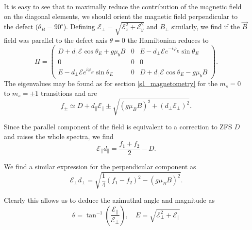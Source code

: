 It is easy to see that to maximally reduce the contribution of the magnetic field on the diagonal elements, we should orient the magnetic field perpendicular to the defect ($\theta_B = 90^\circ$). Defining $\mathcal{E}_\perp = \sqrt{\mathcal{E}_x^2 + \mathcal{E}_y^2}$ and $B_\perp$ similarly, we find if the $\vec{B}$ field was parallel to the defect axis $\theta = 0$ the Hamiltonian reduces to \begin{equation}
H = \begin{pmatrix}
	D + d_\parallel \mathcal{E}\cos\theta_E + g\mu_b B & 0                                                                        & E - d_\perp \mathcal{E} e^{-i \varphi_E}\sin\theta_E                  \\
	0                                                  & 0                                                                        & 0    \\
	E - d_\perp\mathcal{E}e^{i \varphi_E}\sin\theta_E  & 0 & D+ d_\parallel \mathcal{E}\cos\theta_E - g\mu_b B 
\end{pmatrix}.
\label{eq:}
\end{equation}
The eigenvalues may be found as for section \ref{s1_magnetometry} for the $m_s = 0$ to $m_s = \pm 1$ transitions and are  
\begin{equation}
    f_{\pm} \simeq D + d_\parallel \mathcal{E}_\parallel\pm \sqrt{(g \mu_B B)^2 + (d_\perp\mathcal{E}_\perp)^2  }. 
    \label{eq:}
\end{equation}

Since the parallel component of the field is equivalent to a correction to ZFS $D$ and raises the whole spectra, we find 
\begin{equation}
    \mathcal{E}_\parallel d_\parallel = \frac{f_1 + f_2}{2} - D. 
    \label{eq:}
\end{equation}

We find a similar expression for the perpendicular component as 
\begin{equation}
    \mathcal{E}_\perp d_\perp = \sqrt{\frac{1}{4}(f_1 - f_2)^2 -(g \mu_B B)^2}.
    \label{eq:s1_elect_perp}
\end{equation}

Clearly this allows us to deduce the azimuthal angle and magnitude as
\begin{equation}
    \theta = \tan^{-1} \left(\frac{\mathcal{E}_\parallel}{\mathcal{E}_\perp}\right), \quad E = \sqrt{\mathcal{E}_\perp^2 + \mathcal{E}_\parallel}
    \label{eq:}
\end{equation}


